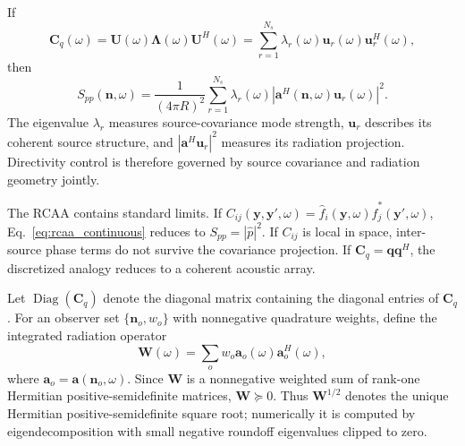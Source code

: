 \documentclass[11pt]{article}
\newcommand{\vect}[1]{\bm{#1}}
\newcommand{\mat}[1]{\bm{#1}}
\begin{document}
If
\begin{equation}
    \mat{C}_q(\omega)
    =
    \mat{U}(\omega)\mat{\Lambda}(\omega)\mat{U}^{H}(\omega)
    =
    \sum_{r=1}^{N_s}
    \lambda_r(\omega)
    \vect{u}_r(\omega)\vect{u}_r^{H}(\omega),
\label{eq:covariance_eigendecomposition}
\end{equation}
then
\begin{equation}
    S_{pp}(\vect{n},\omega)
    =
    \frac{1}{(4\pi R)^2}
    \sum_{r=1}^{N_s}
    \lambda_r(\omega)
    \left|
        \vect{a}^{H}(\vect{n},\omega)
        \vect{u}_r(\omega)
    \right|^2.
\label{eq:modal_radiation_identity}
\end{equation}
The eigenvalue $\lambda_r$ measures source-covariance mode strength, $\vect{u}_r$ describes its coherent source structure, and $|\vect{a}^{H}\vect{u}_r|^2$ measures its radiation projection. Directivity control is therefore governed by source covariance and radiation geometry jointly.

The RCAA contains standard limits. If $C_{ij}(\vect{y},\vect{y}',\omega)=\hat f_i(\vect{y},\omega)\hat f_j^*(\vect{y}',\omega)$, Eq.~\ref{eq:rcaa_continuous} reduces to $S_{pp}=|\hat p|^2$. If $C_{ij}$ is local in space, inter-source phase terms do not survive the covariance projection. If $\mat{C}_q=\vect{q}\vect{q}^{H}$, the discretized analogy reduces to a coherent acoustic array.

Let $\operatorname{Diag}(\mat{C}_q)$ denote the diagonal matrix containing the diagonal entries of $\mat{C}_q$. For an observer set $\{\vect{n}_o,w_o\}$ with nonnegative quadrature weights, define the integrated radiation operator
\begin{equation}
    \mat{W}(\omega)
    =
    \sum_o
    w_o
    \vect{a}_o(\omega)\vect{a}_o^{H}(\omega),
\label{eq:radiation_operator}
\end{equation}
where $\vect{a}_o=\vect{a}(\vect{n}_o,\omega)$. Since $\mat{W}$ is a nonnegative weighted sum of rank-one Hermitian positive-semidefinite matrices, $\mat{W}\succeq0$. Thus $\mat{W}^{1/2}$ denotes the unique Hermitian positive-semidefinite square root; numerically it is computed by eigendecomposition with small negative roundoff eigenvalues clipped to zero.
\end{document}

